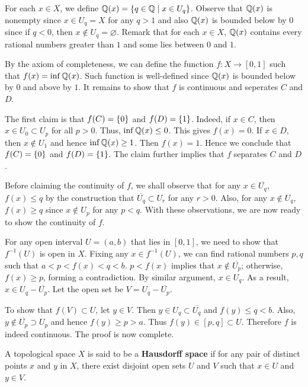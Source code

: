 \begin{pf}
    For each $x\in X$, we define $\mathbb{Q}(x) = 
    \left\{ q\in\mathbb{Q} \;\middle\vert\; x\in U_q \right\}$. Observe that $\mathbb{Q}(x)$ is nonempty 
    since $x\in U_q=X$ for any $q>1$ and also $\mathbb{Q}(x)$ is 
    bounded below by $0$ since if $q<0$, then $x\not\in U_q 
    = \varnothing$. Remark that for each $x\in X$, $\mathbb{Q}(x)$ 
    contains every rational numbers greater than $1$ and some 
    lies between $0$ and $1$.

    By the axiom of completeness, we can define the function 
    $f:X\to[0,1]$ such that $f(x) = \inf\mathbb{Q}(x)$. Such function 
    is well-defined since $\mathbb{Q}(x)$ is bounded below by $0$ and 
    above by $1$. It remains to show that $f$ is continuous 
    and seperates $C$ and $D$.

    The first claim is that $f(C)=\left\{ {0} \right\}$ and $f(D)=\left\{ {1} \right\}$.
    Indeed, if $x\in C$, then $x\in U_0\subset U_p$ for all 
    $p>0$. Thus, $\inf\mathbb{Q}(x)\leq 0$. This gives $f(x)=0$. If 
    $x\in D$, then $x\not\in U_1$ and hence $\inf\mathbb{Q}(x)\geq 1$. 
    Then $f(x)=1$. Hence we conclude that $f(C)=\left\{ {0} \right\}$ and 
    $f(D) = \left\{ {1} \right\}$. The claim further implies that $f$ 
    separates $C$ and $D$. 

    Before claiming the continuity of $f$, we shall observe 
    that for any $x\in\overline{U_q}$, $f(x)\leq q$ by the 
    construction that $\overline{U_q}\subset U_r$ for any 
    $r>0$. Also, for any $x\not\in U_q$, $f(x)\geq q$ since 
    $x\not\in U_p$ for any $p<q$. With these observations, 
    we are now ready to show the continuity of $f$. 

    For any open interval $U = (a,b)$ that lies in $[0,1]$, 
    we need to show that $f^{-1}(U)$ is open in $X$. Fixing 
    any $x\in f^{-1}(U)$, we can find rational numbers $p,q$ 
    such that $a<p<f(x)<q<b$. $p<f(x)$ implies that $x\not\in
    \overline{U_p}$; otherwise, $f(x)\geq p$, forming a 
    contradiction. By similar argument, $x\in U_q$. As a 
    result, $x\in U_q-\overline{U_p}$. Let the open set be 
    $V = U_q-\overline{U_p}$. 

    To show that $f(V)\subset U$, let $y\in V$. Then $y\in 
    U_q\subset\overline{U_q}$ and $f(y)\leq q<b$. Also, $y\not
    \in\overline{U_p}\supset U_p$ and hence $f(y)\geq p>a$. 
    Thus $f(y)\in[p,q]\subset U$. Therefore $f$ is indeed 
    continuous. The proof is now complete.
\end{pf}

\begin{definition}
    A topological space $X$ is said to be a 
    \textbf{Hausdorff space} if for any pair of distinct
    points $x$ and $y$ in $X$, there exist disjoint open 
    sets $U$ and $V$ such that $x\in U$ and $y\in V$. 
\end{definition}

